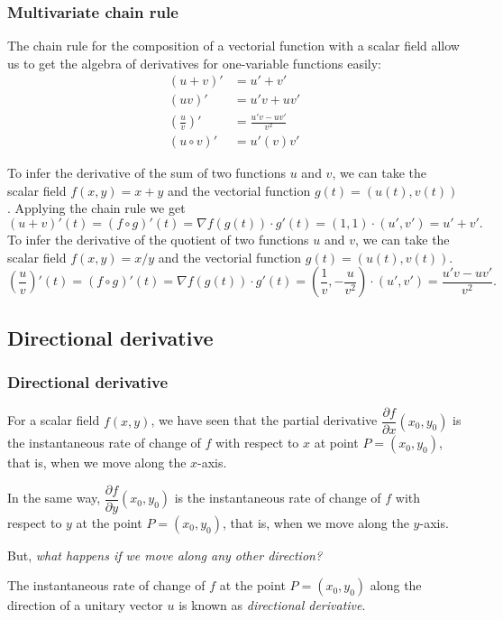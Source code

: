 \begin{frame}
\frametitle{Multivariate chain rule}
The chain rule for the composition of a vectorial function with a scalar field allow us to get the algebra of derivatives for one-variable functions easily:
\begin{align*}
(u+v)' &= u'+v'\\
(uv)' &= u'v+uv'\\
\left(\frac{u}{v}\right)' &= \frac{u'v-uv'}{v^2}\\
(u\circ v)' &= u'(v)v'
\end{align*}

To infer the derivative of the sum of two functions $u$ and $v$, we can take the scalar field $f(x,y)=x+y$ and the vectorial function $g(t)=(u(t),v(t))$.
Applying the chain rule we get
\[
(u+v)'(t) = (f\circ g)'(t) = \nabla f(g(t))\cdot g'(t) = (1,1)\cdot (u',v') = u'+v'.
\]
To infer the derivative of the quotient of two functions $u$ and $v$, we can take the scalar field $f(x,y)=x/y$ and the vectorial function $g(t)=(u(t),v(t))$.
\[
\left(\frac{u}{v}\right)'(t) = (f\circ g)'(t) = \nabla f(g(t))\cdot g'(t) = \left(\frac{1}{v},-\frac{u}{v^2}\right)\cdot (u',v') = \frac{u'v-uv'}{v^2}.
\]
\end{frame}



\subsection{Directional derivative}
\begin{frame}
\frametitle{Directional derivative}
For a scalar field $f(x,y)$, we have seen that the partial derivative $\dfrac{\partial f}{\partial x}(x_0,y_0)$ is the instantaneous rate of change of $f$ with respect to $x$ at point $P=(x_0,y_0)$, that is, when we move along the $x$-axis.

In the same way, $\dfrac{\partial f}{\partial y}(x_0,y_0)$ is the instantaneous rate of change of $f$ with respect to $y$ at the point $P=(x_0,y_0)$, that is, when we move along the $y$-axis.

But, \emph {what happens if we move along any other direction?}

The instantaneous rate of change of $f$ at the point $P=(x_0,y_0)$ along the direction of a unitary vector $u$ is known as \emph{directional derivative}.
\end{frame}


